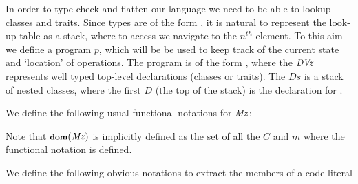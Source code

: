 In order to type-check and flatten our language we need to be able to lookup classes and traits.
Since types
 are of the form ,
it is natural to represent the look-up table as a
stack, where to access  we
navigate to the $n^{th}$ element.
To this aim we define a program $p$, which will be be used to keep track of the current state and `location' of operations.
The program is of the form , where the $\mathit{DVz}$ represents well typed
top-level declarations (classes or traits). The $Ds$ is a stack of nested classes, where the first $D$ (the top of the stack) is the declaration for .


We define the following usual functional notations for  $\mathit{Mz}$:

\begin{defs}
\end{defs}
Note that ${\footnotesize{\textbf{dom}}({\mathit{Mz}})}$ is implicitly defined as the set of all the $C$ and $m$ where the functional notation is defined.

We define the following obvious notations to extract the members of a code-literal

\begin{defs}


\end{defs}

